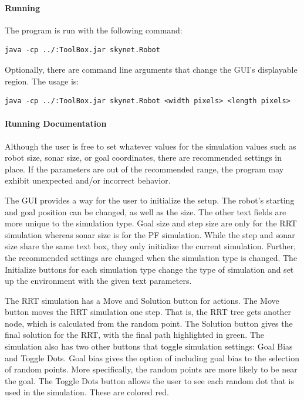 \documentclass[12pt]{article}
\begin{document}
\paragraph*{Running}
The program is run with the following command:
\begin{lstlisting}
java -cp ../:ToolBox.jar skynet.Robot
\end{lstlisting}
Optionally, there are command line arguments that change the GUI's displayable region. The usage is:
\begin{lstlisting}
java -cp ../:ToolBox.jar skynet.Robot <width pixels> <length pixels>
\end{lstlisting}

\paragraph*{Running Documentation}
Although the user is free to set whatever values for the simulation values such as robot size, sonar size, or goal coordinates, there are recommended settings in place. If the parameters are out of the recommended range, the program may exhibit unexpected and/or incorrect behavior.

The GUI provides a way for the user to initialize the setup. The robot's starting and goal position can be changed, as well as the size. The other text fields are more unique to the simulation type. Goal size and step size are only for the RRT simulation whereas sonar size is for the PF simulation. While the step and sonar size share the same text box, they only initialize the current simulation. Further, the recommended settings are changed when the simulation type is changed. The Initialize buttons for each simulation type change the type of simulation and set up the environment with the given text parameters. 

The RRT simulation has a Move and Solution button for actions. The Move button moves the RRT simulation one step. That is, the RRT tree gets another node, which is calculated from the random point. The Solution button gives the final solution for the RRT, with the final path highlighted in green. The simulation also has two other buttons that toggle simulation settings: Goal Bias and Toggle Dots. Goal bias gives the option of including goal bias to the selection of random points. More specifically, the random points are more likely to be near the goal. The Toggle Dots button allows the user to see each random dot that is used in the simulation. These are colored red. 
\end{document}
